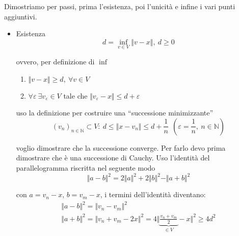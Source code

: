 \documentclass[10pt,a4paper,twoside,openright]{book}
\begin{document}
\begin{dimostrazione}
    Dimostriamo per passi, prima l'esistenza, poi l'unicità e infine i vari punti aggiuntivi.
    \begin{itemize}
        \item Esistenza
              \begin{equation*}
                  d=\inf_{v\in V}\Vert v-x\Vert,\ d\geqslant 0
              \end{equation*}

              ovvero, per definizione di $\inf$
              \begin{enumerate}
                  \item $\displaystyle \Vert v-x\Vert \geqslant d,\ \forall v\in V$
                  \item $\displaystyle \forall \varepsilon \ \exists v_{\varepsilon } \in V$ tale che $\displaystyle \Vert v_{\varepsilon } -x\Vert \leqslant d+\varepsilon $ \ $ $
              \end{enumerate}

              uso la definizione per costruire una ``successione minimizzante''
              \begin{equation}
                  (v_{n})_{n\in \mathbb{N}} \subset V:\ d\leqslant \Vert x-v_{n}\Vert \leqslant d+\frac{1}{n} \ \ \left(\varepsilon =\frac{1}{n},\ n\in \mathbb{N}\right)
                  \label{eq:teo-proiez-suc-min}
              \end{equation}

              voglio dimostrare che la successione converge. Per farlo devo prima dimostrare che è una successione di Cauchy. Uso l'identità del parallelogramma riscritta nel seguente modo
              \begin{equation*}
                  \Vert a-b\Vert ^{2} =2\Vert a\Vert ^{2} +2\Vert b\Vert ^{2} -\Vert a+b\Vert ^{2}
              \end{equation*}

              con $\displaystyle a=v_{n} -x$, $\displaystyle b=v_{m} -x$, i termini dell'identità diventano:
              \begin{equation*}
                  \begin{array}{ l }
                      \Vert a-b\Vert ^{2} =\Vert v_{n} -v_{m}\Vert ^{2} \\
                      \Vert a+b\Vert ^{2} =\Vert v_{n} +v_{m} -2x\Vert ^{2} =4\bigg\Vert \underbrace{\frac{v_{n} +v_{m}}{2}}_{\in V} -x\bigg\Vert ^{2} \geqslant 4d^{2}
                  \end{array}
              \end{equation*}


\end{itemize}
\end{dimostrazione}
\end{document}
